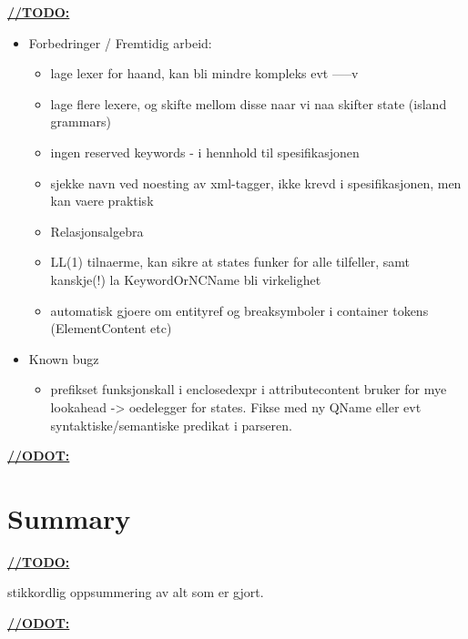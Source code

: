 \label{sect:summary:future_work}
\underline{\textbf{\LARGE //TODO:}}
\begin{itemize}
	\item Forbedringer / Fremtidig arbeid:
	\begin{itemize}
		\item lage lexer for haand, kan bli mindre kompleks evt -----v
		\item lage flere lexere, og skifte mellom disse naar vi naa skifter state (island grammars)
		\item ingen reserved keywords - i hennhold til spesifikasjonen
		\item sjekke navn ved noesting av xml-tagger, ikke krevd i spesifikasjonen, men kan vaere praktisk
		\item Relasjonsalgebra
		\item LL(1) tilnaerme, kan sikre at states funker for alle tilfeller, samt kanskje(!) la KeywordOrNCName bli virkelighet
		\item automatisk gjoere om entityref og breaksymboler i container tokens (ElementContent etc)
	\end{itemize}

	\item Known bugz
	\begin{itemize}
		\item prefikset funksjonskall i enclosedexpr i attributecontent bruker for mye lookahead -> oedelegger for states. Fikse med ny QName eller evt syntaktiske/semantiske predikat i parseren.
	\end{itemize}
	
\end{itemize}

\underline{\textbf{\LARGE //ODOT:}}

\section{Summary}

\underline{\textbf{\LARGE //TODO:}}

stikkordlig oppsummering av alt som er gjort.

\underline{\textbf{\LARGE //ODOT:}}